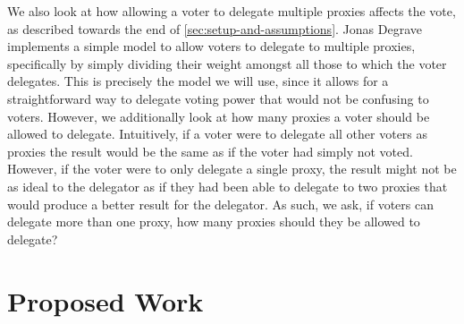 We also look at how allowing a voter to delegate multiple proxies affects the vote,
as described towards the end of \autoref{sec:setup-and-assumptions}.
Jonas Degrave~\cite{Degrave2014} implements a simple model to allow voters to
delegate to multiple proxies, specifically by simply dividing their weight amongst
all those to which the voter delegates.
This is precisely the model we will use, since it allows for a straightforward way to
delegate voting power that would not be confusing to voters.
However, we additionally look at how many proxies a voter should be allowed to
delegate.
Intuitively, if a voter were to delegate all other voters as proxies the result would
be the same as if the voter had simply not voted.
However, if the voter were to only delegate a single proxy, the result might not be
as ideal to the delegator as if they had been able to delegate to two proxies that
would produce a better result for the delegator.
As such, we ask, if voters can delegate more than one proxy, how many proxies should
they be allowed to delegate?



\section{Proposed Work}\label{sec:contribution}

